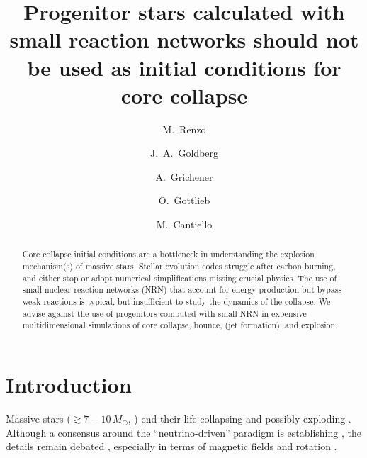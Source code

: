 \documentclass[twocolumn]{aastex63}
\begin{document}
\title{Progenitor stars calculated with small reaction networks
  should not be used as initial conditions for core collapse}

\author[0000-0002-6718-9472]{M.~Renzo}

\author[0000-0003-1012-3031]{J.~A.~Goldberg}

\author[0000-0002-2215-1841]{A.~Grichener}

\author[0000-0003-3115-2456]{O.~Gottlieb}

\author[0000-0002-8171-8596]{M.~Cantiello}

\begin{abstract}
  \noindent
  Core collapse initial conditions are a bottleneck in understanding
  the explosion mechanism(s) of massive stars. Stellar evolution codes
  struggle after carbon burning, and either stop or adopt numerical
  simplifications missing crucial physics. The use of small nuclear
  reaction networks (NRN) that account for energy production but
  bypass weak reactions is typical, but insufficient to study the
  dynamics of the collapse. We advise against the use of progenitors
  computed with small NRN in expensive multidimensional simulations of
  core collapse, bounce, (jet formation), and explosion.
\end{abstract}

\section{Introduction}

Massive stars ($\gtrsim 7-10\,M_\odot$, \citealt{doherty:15,
  poelarends:17}) end their life collapsing and possibly exploding
\citep[e.g.,][]{janka:12, burrows:21, soker:24}. Although a consensus
around the ``neutrino-driven'' paradigm is establishing
\citep[e.g.,][]{wang:23, nakamura:24}, the details remain debated
\citep[e.g.,][]{shishkin:22, soker:22}, especially in terms of magnetic
fields and rotation \citep[e.g.,][]{symbalisty:84, mosta:15, aloy:21}.
\end{document}
